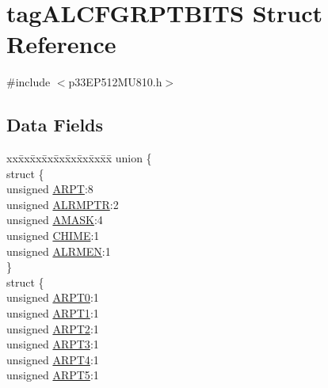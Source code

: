 \hypertarget{structtag_a_l_c_f_g_r_p_t_b_i_t_s}{}\section{tag\+A\+L\+C\+F\+G\+R\+P\+T\+B\+I\+TS Struct Reference}
\label{structtag_a_l_c_f_g_r_p_t_b_i_t_s}


{\ttfamily \#include $<$p33\+E\+P512\+M\+U810.\+h$>$}

\subsection*{Data Fields}
\begin{DoxyCompactItemize}
\item 
\begin{tabbing}
xx\=xx\=xx\=xx\=xx\=xx\=xx\=xx\=xx\=\kill
union \{\\
\>struct \{\\
\>\>unsigned \hyperlink{structtag_a_l_c_f_g_r_p_t_b_i_t_s_ab68669a9276560162e46e6ddac92d175}{ARPT}:8\\
\>\>unsigned \hyperlink{structtag_a_l_c_f_g_r_p_t_b_i_t_s_a39adb2cfec069c40e94e2870ae930949}{ALRMPTR}:2\\
\>\>unsigned \hyperlink{structtag_a_l_c_f_g_r_p_t_b_i_t_s_af5f0e3ab12a63066ed2ea98542d63df6}{AMASK}:4\\
\>\>unsigned \hyperlink{structtag_a_l_c_f_g_r_p_t_b_i_t_s_ade47a27c0f187a4f3c04149d70f14094}{CHIME}:1\\
\>\>unsigned \hyperlink{structtag_a_l_c_f_g_r_p_t_b_i_t_s_a04cd84f60551c23f80f943b156bec548}{ALRMEN}:1\\
\>\} \\
\>struct \{\\
\>\>unsigned \hyperlink{structtag_a_l_c_f_g_r_p_t_b_i_t_s_ae2c48674f7436f947f18710836df88d0}{ARPT0}:1\\
\>\>unsigned \hyperlink{structtag_a_l_c_f_g_r_p_t_b_i_t_s_a6248f20a9f36d2e5e716a7b04b48a0cb}{ARPT1}:1\\
\>\>unsigned \hyperlink{structtag_a_l_c_f_g_r_p_t_b_i_t_s_a5bc6c44814b0937e92845bb9735591a8}{ARPT2}:1\\
\>\>unsigned \hyperlink{structtag_a_l_c_f_g_r_p_t_b_i_t_s_a1e79e6b85e7e1f2c0442fa408b63e877}{ARPT3}:1\\
\>\>unsigned \hyperlink{structtag_a_l_c_f_g_r_p_t_b_i_t_s_a6bb5eb98dcff55878cc3d0e301388e41}{ARPT4}:1\\
\>\>unsigned \hyperlink{structtag_a_l_c_f_g_r_p_t_b_i_t_s_a4a832bb257713ded62082c08d715011a}{ARPT5}:1\\

\end{tabbing}
\end{DoxyCompactItemize}
